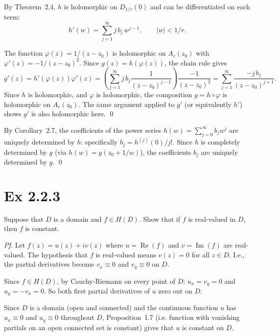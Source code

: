 \documentclass[a4paper]{article}
\begin{document}
\medskip
By Theorem~2.4, $h$ is holomorphic on $D_{1/r}(0)$ and can be differentiated on each term:
\[
h'(w) = \sum_{j=1}^{\infty} j\,b_j\,w^{j-1}, \qquad |w| < 1/r.
\]

\medskip The function $\varphi(z) = 1/(z - z_0)$ is holomorphic on $A_r(z_0)$ with $\varphi'(z) = -1/(z-z_0)^2$.  Since $g(z) = h(\varphi(z))$, the chain rule gives
\[
g'(z) = h'(\varphi(z))\varphi'(z) = \left(\sum_{j=1}^{\infty} j\,b_j \frac{1}{(z-z_0)^{j-1}}\right) \frac{-1}{(z-z_0)^2} = \sum_{j=1}^{\infty} \frac{-j\,b_j}{(z-z_0)^{j+1}}.
\]
Since $h$ is holomorphic, and $\varphi$ is holomorphic, the composition $g = h \circ \varphi$ is holomorphic on $A_r(z_0)$.  The same argument applied to $g'$ (or equivalently $h'$) shows $g'$ is also holomorphic here. \qed

\medskip
By Corollary~2.7, the coefficients of the power series $h(w) = \sum_{j=0}^\infty b_j w^j$ are uniquely determined by $h$: specifically $b_j = h^{(j)}(0)/j!$.  Since $h$ is completely determined by $g$ (via $h(w) = g(z_0 + 1/w)$), the coefficients $b_j$ are uniquely determined by $g$. \qed

\newpage
\section*{Ex 2.2.3}

\begin{tcolorbox}[colback=gray!10, colframe=black, boxrule=0.5pt, arc=2mm]
Suppose that $D$ is a domain and $f \in H(D)$. Show that if $f$ is real-valued in $D$, then $f$ is constant.
\end{tcolorbox}

\textit{Pf.} Let $f(z) = u(z) + iv(z)$ where $u = \operatorname{Re}(f)$ and $v = \operatorname{Im}(f)$ are real-valued.  The hypothesis that $f$ is real-valued means $v(z) = 0$ for all $z \in D$.  I.e., the partial derivatives become $v_x \equiv 0$ and $v_y \equiv 0$ on $D$.

\medskip
Since $f \in H(D)$, by Cauchy-Riemann on every point of $D$: $u_x = v_y = 0$ and $u_y = -v_x = 0$.
So both first partial derivatives of $u$ zero out on $D$.

\medskip
Since $D$ is a domain (open and connected) and the continuous function $u$ has $u_x \equiv 0$ and $u_y \equiv 0$ throughout $D$, Proposition~1.7 (i.e. function with vanishing partials on an open connected set is constant) gives that $u$ is constant on $D$.
\end{document}
